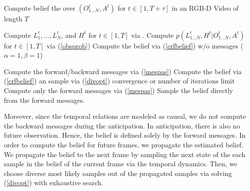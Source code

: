 \setlength{\textfloatsep}{0.1pt}
\begin{algorithm}
\caption{Compute belief the over $(O^t_{1\ldots N},A^t)$ for \mbox{$t \in [1,T+\tau]$} in an RGB-D Video of length $T$}
\label{alg:recursive}
\begin{algorithmic}
\STATE Compute $L^t_1,\ldots,L^t_N$, and $H^t$ for $t \in [1,T]$ via \cite{hemaIJRR}.
\STATE Compute $p(L^t_{1\ldots N},H^t|O^t_{1\ldots N},A^t)$ for $t \in [1,T]$ via (\ref{obsprob})
\STATE Compute the belief via (\ref{crfbelief}) w/o messages ($\alpha=1,\beta=1$)
\end{algorithmic}
\begin{algorithmic}
\REPEAT
{}
\STATE Compute the forward/backward messages via (\ref{mespas})
\STATE Compute the belief via (\ref{crfbelief}) an sample via (\ref{divopt})
\ENDFOR
\UNTIL convergence or number of iterations limit
\STATE Compute only the forward messages via (\ref{mespas})
\STATE Sample the belief directly from the forward messages.
\ENDFOR
\end{algorithmic}
\end{algorithm}

Moreover, since the temporal relations are modeled as causal, we do not compute the backward messages during the anticipation. In anticipation, there is also no future observation. Hence, the belief is defined solely by the forward messages. In order to compute the belief for future frames, we propagate the estimated belief. We propagate the belief to the next frame by sampling the next state of the each sample in the belief of the current frame via the temporal dynamics. Then, we choose diverse most likely samples out of the propagated samples via solving (\ref{divopt}) with exhaustive search.
